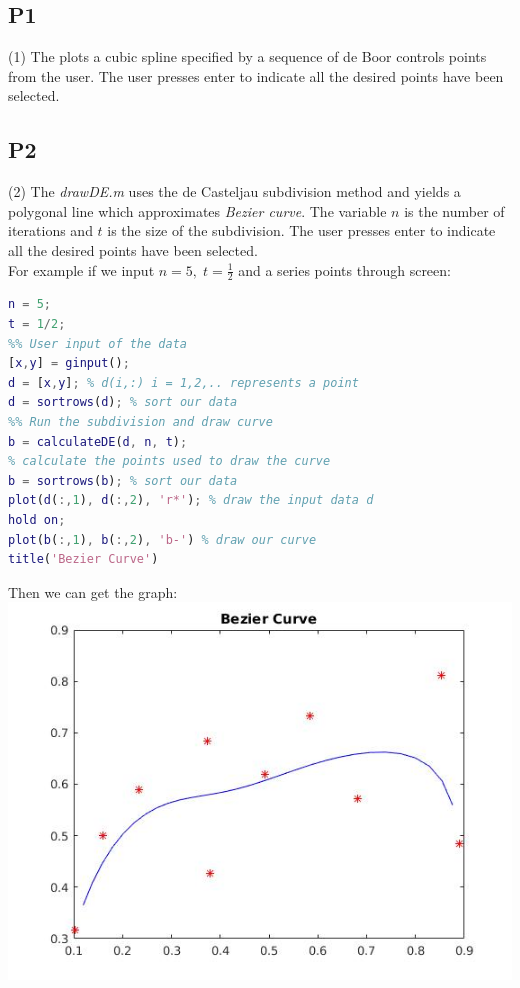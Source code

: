 \documentclass[12pt]{article}
\begin{document}
\subsection*{P1}
(1) 
The  plots a cubic spline specified by a sequence of de Boor controls points from the user. The user presses enter to indicate all the desired points have been selected. 
\\

\subsection*{P2}
(2) 
The \textit{drawDE.m} uses the de Casteljau subdivision method and  yields a polygonal line which approximates \textit{Bezier curve}. The variable $n$ is the number of iterations and $t$ is the size of the subdivision. The user presses enter to indicate all the desired points have been selected. 
\\
For example if we input $n = 5 , \; t = \frac{1}{2}$ and a series points through screen: 

\begin{lstlisting}[language=Matlab]
n = 5; 
t = 1/2; 
%% User input of the data
[x,y] = ginput();  
d = [x,y]; % d(i,:) i = 1,2,.. represents a point 
d = sortrows(d); % sort our data 
%% Run the subdivision and draw curve
b = calculateDE(d, n, t); 
% calculate the points used to draw the curve 
b = sortrows(b); % sort our data 
plot(d(:,1), d(:,2), 'r*'); % draw the input data d
hold on;
plot(b(:,1), b(:,2), 'b-') % draw our curve 
title('Bezier Curve')
\end{lstlisting}
Then we can get the graph: \\
\includegraphics[scale=.5]{npoints}
\end{document}
